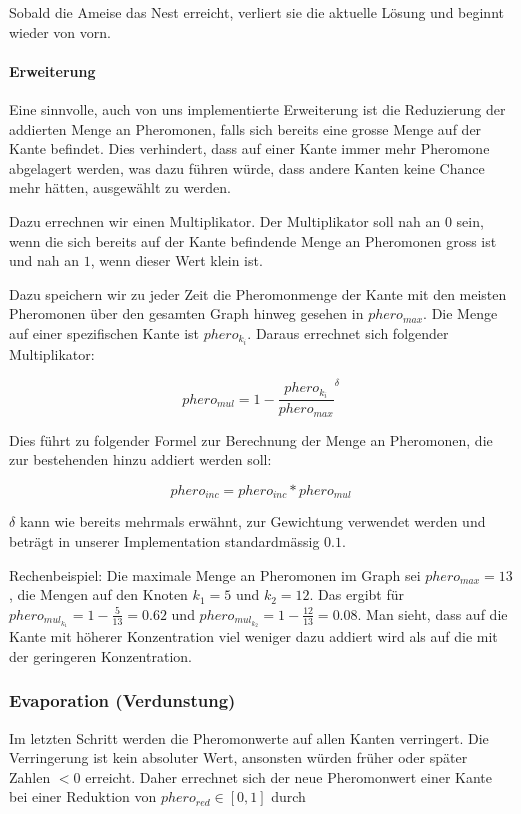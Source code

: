 Sobald die Ameise das Nest erreicht, verliert sie die aktuelle Lösung und beginnt wieder von vorn.

\paragraph*{Erweiterung}

Eine sinnvolle, auch von uns implementierte Erweiterung ist die Reduzierung der addierten Menge an Pheromonen, falls sich bereits eine grosse Menge auf der Kante befindet. Dies verhindert, dass auf einer Kante immer mehr Pheromone abgelagert werden, was dazu führen würde, dass andere Kanten keine Chance mehr hätten, ausgewählt zu werden.

Dazu errechnen wir einen Multiplikator. Der Multiplikator soll nah an $0$ sein, wenn die sich bereits auf der Kante befindende Menge an Pheromonen gross ist und nah an $1$, wenn dieser Wert klein ist.

Dazu speichern wir zu jeder Zeit die Pheromonmenge der Kante mit den meisten Pheromonen über den gesamten Graph hinweg gesehen in  $phero_{max}$. Die Menge auf einer spezifischen Kante ist $phero_{k_i}$. Daraus errechnet sich folgender Multiplikator:

\[ phero_{mul} ={ 1 - \frac{phero_{k_i}}{phero_{max}}}^\delta \]

Dies führt zu folgender Formel zur Berechnung der Menge an Pheromonen, die zur bestehenden hinzu addiert werden soll:

\[ phero_{inc} = phero_{inc} * phero_{mul} \]

$\delta$ kann wie bereits mehrmals erwähnt, zur Gewichtung verwendet werden und beträgt in unserer Implementation standardmässig $0.1$.

Rechenbeispiel: Die maximale Menge an Pheromonen im Graph sei $phero_{max} = 13$, die Mengen auf den Knoten $k_1 = 5$ und $k_2 = 12$. Das ergibt für $phero_{mul_{k_1}} = 1 - \frac{5}{13} = 0.62$ und $phero_{mul_{k_2}} = 1 - \frac{12}{13} = 0.08$. Man sieht, dass auf die Kante mit höherer Konzentration viel weniger dazu addiert wird als auf die mit der geringeren Konzentration.

\subsubsection*{Evaporation (Verdunstung)}

Im letzten Schritt werden die Pheromonwerte auf allen Kanten verringert. Die Verringerung ist kein absoluter Wert, ansonsten würden früher oder später Zahlen $< 0$ erreicht. Daher errechnet sich der neue Pheromonwert einer Kante bei einer Reduktion von $phero_{red} \in [0, 1]$ durch

